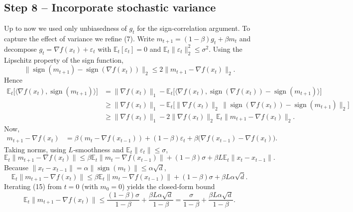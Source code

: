 \documentclass{article}
\begin{document}
\subsection*{Step 8 – Incorporate stochastic variance}
Up to now we used only unbiasedness of $g_t$ for the sign‑correlation argument.  To capture the effect of variance we refine (7).  Write $m_{t+1}= (1-\beta)g_t + \beta m_t$ and decompose $g_t=\nabla f(x_t)+\varepsilon_t$ with $\mathbb{E}_t[\varepsilon_t]=0$ and $\mathbb{E}_t\|\varepsilon_t\|_2^{2}\le\sigma^{2}$.  Using the Lipschitz property of the sign function,
\[
\bigl\|\operatorname{sign}(m_{t+1})-\operatorname{sign}(\nabla f(x_t))\bigr\|_2
\le 2\bigl\|m_{t+1}-\nabla f(x_t)\bigr\|_2 .
\]
Hence
\[
\begin{aligned}
\mathbb{E}_t\!\bigl[\langle\nabla f(x_t),\operatorname{sign}(m_{t+1})\rangle\bigr]
&= \|\nabla f(x_t)\|_{1}
-\mathbb{E}_t\!\bigl[\langle\nabla f(x_t),\operatorname{sign}(\nabla f(x_t))-
\operatorname{sign}(m_{t+1})\rangle\bigr] \\[2mm]
&\ge \|\nabla f(x_t)\|_{1}
- \mathbb{E}_t\!\bigl[\|\nabla f(x_t)\|_{2}\,
\bigl\|\operatorname{sign}(\nabla f(x_t))-
\operatorname{sign}(m_{t+1})\bigr\|_{2}\bigr] \\[2mm]
&\ge \|\nabla f(x_t)\|_{1}
-2\|\nabla f(x_t)\|_{2}\,
\mathbb{E}_t\!\bigl\|m_{t+1}-\nabla f(x_t)\bigr\|_{2}.
\end{aligned}
\tag{13}
\]
Now,
\[
\begin{aligned}
m_{t+1}-\nabla f(x_t)
&= \beta(m_t-\nabla f(x_{t-1}))
+(1-\beta)\varepsilon_t
+\beta\bigl(\nabla f(x_{t-1})-\nabla f(x_t)\bigr) .
\end{aligned}
\]
Taking norms, using $L$‑smoothness and $\mathbb{E}_t\|\varepsilon_t\|\le\sigma$,
\[
\mathbb{E}_t\|m_{t+1}-\nabla f(x_t)\|
\le \beta\mathbb{E}_t\|m_t-\nabla f(x_{t-1})\|
+(1-\beta)\sigma
+\beta L\mathbb{E}_t\|x_t-x_{t-1}\| . \tag{14}
\]
Because $\|x_t-x_{t-1}\|=\alpha\|\operatorname{sign}(m_t)\|\le\alpha\sqrt{d}$,
\[
\mathbb{E}_t\|m_{t+1}-\nabla f(x_t)\|
\le \beta\mathbb{E}_t\|m_t-\nabla f(x_{t-1})\|
+(1-\beta)\sigma+\beta L\alpha\sqrt{d}. \tag{15}
\]
Iterating (15) from $t=0$ (with $m_0=0$) yields the closed‑form bound
\[
\mathbb{E}_t\|m_{t+1}-\nabla f(x_t)\|
\le \frac{(1-\beta)\sigma}{1-\beta}
+\frac{\beta L\alpha\sqrt{d}}{1-\beta}
= \frac{\sigma}{1-\beta}+ \frac{\beta L\alpha\sqrt{d}}{1-\beta}. \tag{16}
\]
\end{document}
